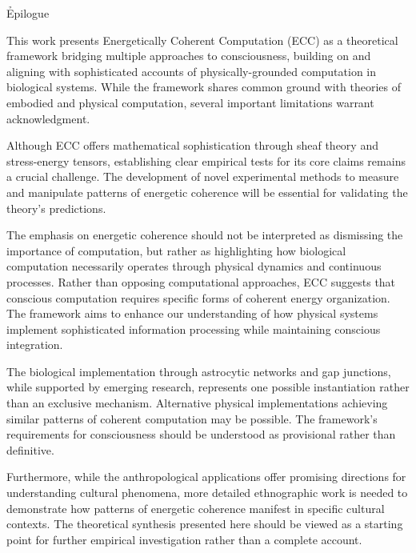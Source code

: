 \h{Epilogue}

This work presents Energetically Coherent Computation (ECC) as a theoretical framework bridging multiple approaches to consciousness, building on and aligning with sophisticated accounts of physically-grounded computation in biological systems. While the framework shares common ground with theories of embodied and physical computation, several important limitations warrant acknowledgment.

Although ECC offers mathematical sophistication through sheaf theory and stress-energy tensors, establishing clear empirical tests for its core claims remains a crucial challenge. The development of novel experimental methods to measure and manipulate patterns of energetic coherence will be essential for validating the theory's predictions. 

The emphasis on energetic coherence should not be interpreted as dismissing the importance of computation, but rather as highlighting how biological computation necessarily operates through physical dynamics and continuous processes. Rather than opposing computational approaches, ECC suggests that conscious computation requires specific forms of coherent energy organization. The framework aims to enhance our understanding of how physical systems implement sophisticated information processing while maintaining conscious integration.

The biological implementation through astrocytic networks and gap junctions, while supported by emerging research, represents one possible instantiation rather than an exclusive mechanism. Alternative physical implementations achieving similar patterns of coherent computation may be possible. The framework's requirements for consciousness should be understood as provisional rather than definitive.

Furthermore, while the anthropological applications offer promising directions for understanding cultural phenomena, more detailed ethnographic work is needed to demonstrate how patterns of energetic coherence manifest in specific cultural contexts. The theoretical synthesis presented here should be viewed as a starting point for further empirical investigation rather than a complete account.